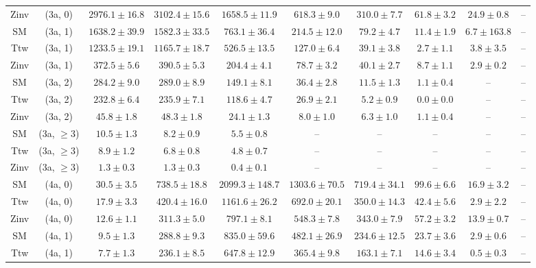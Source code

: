\begin{table}[h!]
{\begin{tabular}{cccccccccc}
	Zinv & (3a, 0) & $2976.1\pm 16.8$ & $3102.4\pm 15.6$ & $1658.5\pm 11.9$ & $618.3\pm 9.0$ & $310.0\pm 7.7$ & $61.8\pm 3.2$ & $24.9\pm 0.8$ & -- \\[0.5ex] 
	SM & (3a, 1) & $1638.2\pm 39.9$ & $1582.3\pm 33.5$ & $763.1\pm 36.4$ & $214.5\pm 12.0$ & $79.2\pm 4.7$ & $11.4\pm 1.9$ & $6.7\pm 163.8$ & -- \\[0.5ex] 
	Ttw & (3a, 1) & $1233.5\pm 19.1$ & $1165.7\pm 18.7$ & $526.5\pm 13.5$ & $127.0\pm 6.4$ & $39.1\pm 3.8$ & $2.7\pm 1.1$ & $3.8\pm 3.5$ & -- \\[0.5ex] 
	Zinv & (3a, 1) & $372.5\pm 5.6$ & $390.5\pm 5.3$ & $204.4\pm 4.1$ & $78.7\pm 3.2$ & $40.1\pm 2.7$ & $8.7\pm 1.1$ & $2.9\pm 0.2$ & -- \\[0.5ex] 
	SM & (3a, 2) & $284.2\pm 9.0$ & $289.0\pm 8.9$ & $149.1\pm 8.1$ & $36.4\pm 2.8$ & $11.5\pm 1.3$ & $1.1\pm 0.4$ & -- & -- \\[0.5ex] 
	Ttw & (3a, 2) & $232.8\pm 6.4$ & $235.9\pm 7.1$ & $118.6\pm 4.7$ & $26.9\pm 2.1$ & $5.2\pm 0.9$ & $0.0\pm 0.0$ & -- & -- \\[0.5ex] 
	Zinv & (3a, 2) & $45.8\pm 1.8$ & $48.3\pm 1.8$ & $24.1\pm 1.3$ & $8.0\pm 1.0$ & $6.3\pm 1.0$ & $1.1\pm 0.4$ & -- & -- \\[0.5ex] 
	SM & (3a, $\ge3$) & $10.5\pm 1.3$ & $8.2\pm 0.9$ & $5.5\pm 0.8$ & -- & -- & -- & -- & -- \\[0.5ex] 
	Ttw & (3a, $\ge3$) & $8.9\pm 1.2$ & $6.8\pm 0.8$ & $4.8\pm 0.7$ & -- & -- & -- & -- & -- \\[0.5ex] 
	Zinv & (3a, $\ge3$) & $1.3\pm 0.3$ & $1.3\pm 0.3$ & $0.4\pm 0.1$ & -- & -- & -- & -- & -- \\[0.5ex] 
	SM & (4a, 0) & $30.5\pm 3.5$ & $738.5\pm 18.8$ & $2099.3\pm 148.7$ & $1303.6\pm 70.5$ & $719.4\pm 34.1$ & $99.6\pm 6.6$ & $16.9\pm 3.2$ & -- \\[0.5ex] 
	Ttw & (4a, 0) & $17.9\pm 3.3$ & $420.4\pm 16.0$ & $1161.6\pm 26.2$ & $692.0\pm 20.1$ & $350.0\pm 14.3$ & $42.4\pm 5.6$ & $2.9\pm 2.2$ & -- \\[0.5ex] 
	Zinv & (4a, 0) & $12.6\pm 1.1$ & $311.3\pm 5.0$ & $797.1\pm 8.1$ & $548.3\pm 7.8$ & $343.0\pm 7.9$ & $57.2\pm 3.2$ & $13.9\pm 0.7$ & -- \\[0.5ex] 
	SM & (4a, 1) & $9.5\pm 1.3$ & $288.8\pm 9.3$ & $835.0\pm 59.6$ & $482.1\pm 26.9$ & $234.6\pm 12.5$ & $23.7\pm 3.6$ & $2.9\pm 0.6$ & -- \\[0.5ex] 
	Ttw & (4a, 1) & $7.7\pm 1.3$ & $236.1\pm 8.5$ & $647.8\pm 12.9$ & $365.4\pm 9.8$ & $163.1\pm 7.1$ & $14.6\pm 3.4$ & $0.5\pm 0.3$ & -- \\[0.5ex] 

\end{tabular}}
\end{table}
